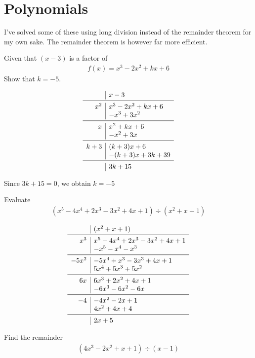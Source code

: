 \documentclass[a4paper]{article}
\begin{document}
\section{Polynomials}
I've solved some of these using long division instead of the remainder theorem for my own sake. The remainder theorem is however far more efficient.
\begin{question}
Given that \((x-3)\) is a factor of 
\begin{align*}
f(x) = x^3 - 2x^2 + kx +6
\end{align*}
Show that \(k=-5\).
\end{question}
\[
\begin{array}{r|l}
& x-3 \\
\midrule
x^2 & x^3 -2x^2 +kx +6 \\
& -x^3 +3x^2 \\
\midrule
x & x^2 +kx +6 \\
& -x^2 + 3x \\
\midrule
k+3 & (k+3)x +6 \\
& -(k+3)x +3k+39\\
\midrule
& 3k+15
\end{array}
\]

Since \(3k+15 = 0\), we obtain \(k=-5\)

\begin{question}
Evaluate
\begin{align*}
(x^5 -4x^4 +2x^3 -3x^2 +4x +1) \div (x^2 +x +1)
\end{align*}
\end{question}

\[
\begin{array}{r|l}
& (x^2 + x + 1) \\
\midrule
x^3 & x^5- 4x^4 + 2x^3 -3x^2 +4x +1   \\
& -x^5 -x^4 -x^3 \\
\midrule
-5x^2 & -5x^4 +x^3 -3x^3 +4x +1 \\
&5x^4 + 5x^3 + 5x^2 \\
\midrule
6x & 6x^3 +2x^2 +4x +1 \\
& -6x^3 -6x^2 -6x \\
\midrule
-4 & -4x^2 -2x +1 \\
& 4x^2 +4x +4 \\
\midrule
& 2x + 5
\end{array}
\]

\begin{question}
Find the remainder
\begin{align*}
(4x^3 -2x^2 +x +1) \div  (x-1)
\end{align*}
\end{question}
\end{document}
